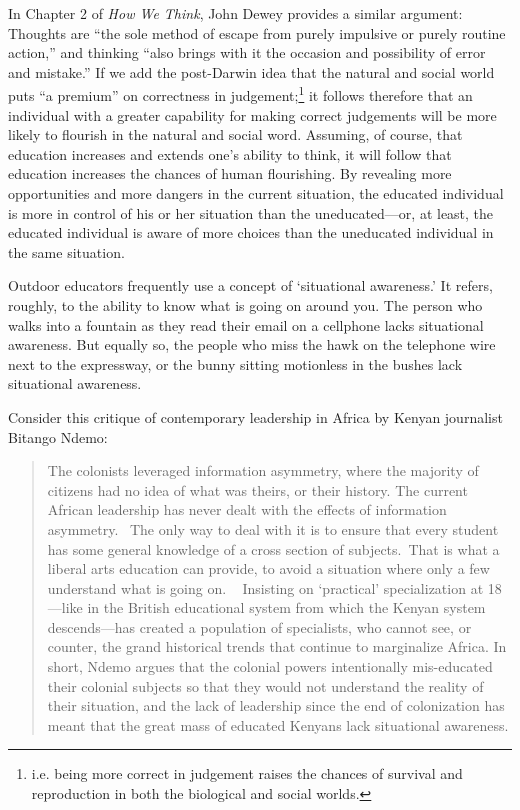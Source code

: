 In Chapter 2 of \emph{How We Think}, John Dewey provides a similar argument: Thoughts are ``the sole method of escape from purely impulsive or purely routine action,'' and thinking ``also brings with it the occasion and possibility of error and mistake.'' If we add the post-Darwin idea that the natural and social world puts ``a premium'' on correctness in judgement;\footnote{i.e. being more correct in judgement raises the chances of survival and reproduction in both the biological and social worlds.} it follows therefore that an individual with a greater capability for making correct judgements will be more likely to flourish in the natural and social word. Assuming, of course, that education increases and extends one's ability to think, it will follow that education increases the chances of human flourishing. By revealing more opportunities and more dangers in the current situation, the educated individual is more in control of his or her situation than the uneducated---or, at least, the educated individual is aware of more choices than the uneducated individual in the same situation. ~\citep{Dewey:1910wx}

Outdoor educators frequently use a concept of `situational awareness.' It refers, roughly, to the ability to know what is going on around you. The person who walks into a fountain as they read their email on a cellphone lacks situational awareness. But equally so, the people who miss the hawk on the telephone wire next to the expressway, or the bunny sitting motionless in the bushes lack situational awareness. 

Consider this critique of contemporary leadership in Africa by Kenyan journalist Bitango Ndemo:

\begin{quote}

The colonists leveraged information asymmetry, where the majority of citizens had no idea of what was theirs, or their history. The current African leadership has never dealt with the effects of information asymmetry. 
The only way to deal with it is to ensure that every student has some general knowledge of a cross section of subjects. That is what a liberal arts education can provide, to avoid a situation where only a few understand what is going on. ~\citep{NDEMO:2017wc}
Insisting on `practical' specialization at 18---like in the British educational system from which the Kenyan system descends---has created a population of specialists, who cannot see, or counter, the grand historical trends that continue to marginalize Africa. In short, Ndemo argues that the colonial powers intentionally mis-educated their colonial subjects so that they would not understand the reality of their situation, and the lack of leadership since the end of colonization has meant that the great mass of educated Kenyans lack situational awareness.
\end{quote}

